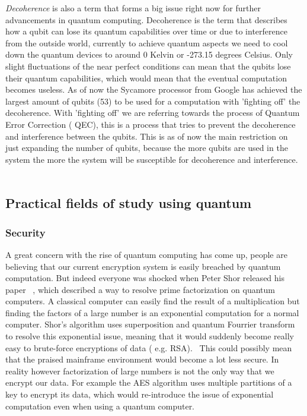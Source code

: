 \emph{Decoherence} is also a term that forms a big issue right now for further advancements in quantum computing. Decoherence is the term that describes how a qubit can lose its quantum capabilities over time or due to interference from the outside world, currently to achieve quantum aspects we need to cool down the quantum devices to around 0 Kelvin or -273.15 degrees Celsius. Only slight fluctuations of the near perfect conditions can mean that the qubits lose their quantum capabilities, which would mean that the eventual computation becomes useless. As of now the Sycamore processor from Google has achieved the largest amount of qubits (53) to be used for a computation with 'fighting off' the decoherence. With 'fighting off' we are referring towards the process of Quantum Error Correction ( QEC), this is a process that tries to prevent the decoherence and interference between the qubits. This is as of now the main restriction on just expanding the number of qubits, because the more qubits are used in the system the more the system will be susceptible for decoherence and interference. ~\autocite{Cory1998}

\subsection{Practical fields of study using quantum}

\subsubsection{Security}
A great concern with the rise of quantum computing has come up, people are believing that our current encryption system is easily breached by quantum computation. But indeed everyone was shocked when Peter Shor released his paper ~\textcite{Shor1994}, which described a way to resolve prime factorization on quantum computers. A classical computer can easily find the result of a multiplication but finding the factors of a large number is an exponential computation for a normal computer. Shor's algorithm uses superposition and quantum Fourrier transform to resolve this exponential issue, meaning that it would suddenly become really easy to brute-force encryptions of data ( e.g. RSA).~\autocite{Rivest1978} This could possibly mean that the praised mainframe environment would become a lot less secure. In reality however factorization of large numbers is not the only way that we encrypt our data. For example the AES algorithm uses multiple partitions of a key to encrypt its data, which would re-introduce the issue of exponential computation even when using a quantum computer.


